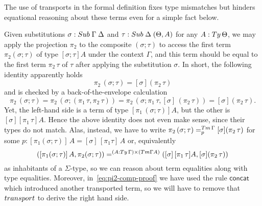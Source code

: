 \documentclass[a4paper,UKenglish,numberwithinsect,cleveref,thm-restate]{lipics-v2021}
\begin{document}
The use of transports in the formal definition fixes type mismatches but hinders equational reasoning about these terms even for a simple fact below.
\begin{example}\label{ex:pi2-comp}
  Given substitutions $\sigma : \Sub\;\Gamma\; \Delta$ and $\tau : \Sub\;\Delta\;(\Theta, A)$ for any $A : \Ty\,\Theta$, we may apply the projection $\pi_2$ to the composite $(\sigma; \tau)$ to access the first term $\pi_2(\sigma; \tau)$ of type $[\sigma;\tau] A$ under the context $\Gamma$, and this term should be equal to the first term $\pi_2\,\tau$ of $\tau$ after applying the substitution $\sigma$. 
  In short, the following identity apparently holds
  \[
    \pi_2\,(\sigma ; \tau) = [\sigma] (\pi_2\,\tau)
  \]
  and is checked by a back-of-the-envelope calculation
  \begin{equation} \label{eq:pi2-comp-proof}
    \pi_2\,(\sigma ; \tau) 
    = \pi_2\,(\sigma; (\pi_1\,\tau, \pi_2\,\tau))
    = \pi_2\,(\sigma;\pi_1\,\tau, [\sigma]\,(\pi_2\,\tau))
    = [\sigma] (\pi_2\,\tau).
  \end{equation}
  Yet, the left-hand side is a term of type $[\pi_1\,(\sigma;\tau)] A$, but the other is $[\sigma] [\pi_1\,\tau] A$.
  Hence the above identity does not even make sense, since their types do not match.
  Alas, instead, we have to write $\pi_2\,(\sigma ; \tau) =^{\Tm\,\Gamma}_{p} [\sigma] (\pi_2\,\tau)$ for some $p: [\pi_1(\sigma; \tau)]\,A = [\sigma]\,[\pi_1\tau]\,A$ or, equivalently
  \begin{equation}\label{eq:pi2-comp-real-proof}
    ([\pi_1(\sigma; \tau)]\,A, \pi_2(\sigma; \tau)) =^{(A : \Ty\,\Gamma) \times (\Tm \Gamma A)} ([\sigma]\,[\pi_1\,\tau]A, [\sigma] (\pi_2\,\tau))
  \end{equation}
  as inhabitants of a $\Sigma$-type, so we can reason about term equalities along with type equalities.
  Moreover, in~\eqref{eq:pi2-comp-proof} we have used the rule $\mathsf{concat}$ which introduced another transported term, so we will have to remove that $\transp$ to derive the right hand side.


\end{example}
\end{document}
